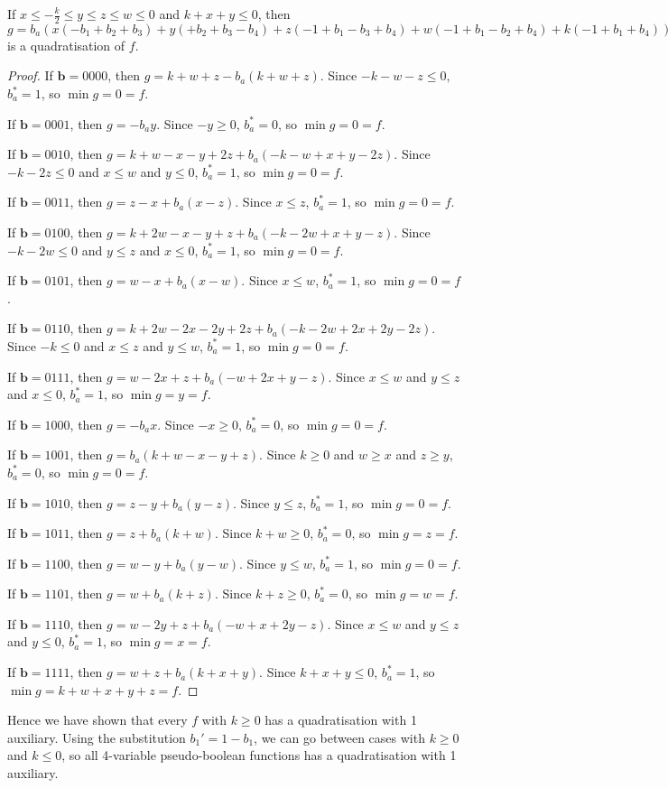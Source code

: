 \documentclass[11pt]{scrartcl}
\newcommand{\vc}[1]{\boldsymbol{#1}}
\begin{document}
\begin{lemma}
	\label{case2}
 If $x \le -\frac{k}{2} \le y \le z \le w \le 0$ and $k+x+y \le 0$, then $g = b_a(x(-b_1+b_2+b_3)+y(+b_2+b_3-b_4)+z(-1+b_1-b_3+b_4)+w(-1+b_1-b_2+b_4)+k(-1+b_1+b_4))+x(-b_2-b_3+b_1b_2+b_1b_3)+y(-b_2-b_3+b_2b_4+b_3b_4)+z(+1 -b_1+b_3-b_4+b_1b_4)+w(+1 -b_1+b_2-b_4+b_1b_4)+k(+1 -b_1-b_4+b_1b_4)$ is a quadratisation of $f$.
 \end{lemma}

\begin{proof}
If $\vc b = 0000$, then $g = k + w + z - b_a(k + w + z)$.
Since $-k - w - z \le 0$, $b_a^* = 1$, so $\min g = 0 = f$.

If $\vc b = 0001$, then $g = -b_ay$.
Since $-y \ge 0$, $b_a^* = 0 $, so $\min g = 0 = f$.

If $\vc b = 0010$, then $g = k + w - x - y + 2z + b_a(-k - w + x + y - 2z)$.
Since $-k - 2z \le 0$ and $x \le w$ and $ y \le 0$, $b_a^* = 1$, so $\min g = 0 = f$.

If $\vc b = 0011$, then $g = z - x + b_a(x - z)$.
Since $x \le z$, $b_a^* = 1$, so $\min g = 0 = f$.

If $\vc b = 0100$, then $g = k + 2w - x - y + z + b_a(-k - 2w + x + y - z)$.
Since $-k - 2w \le 0$ and $y \le z$ and $x \le 0$, $b_a^* = 1$, so $\min g = 0 = f$.

If $\vc b = 0101$, then $g = w - x + b_a(x - w)$.
Since $x \le w$, $b_a^* = 1$, so $\min g = 0 = f$.

If $\vc b = 0110$, then $g = k + 2w - 2x - 2y + 2z + b_a(-k -2w + 2x + 2y - 2z)$.
Since $-k \le 0$ and $x \le z$ and $y \le w$, $b_a^* = 1$, so $\min g = 0 = f$.

If $\vc b = 0111$, then $g = w - 2x + z + b_a(-w + 2x + y - z)$.
Since $x \le w$ and $y \le z$ and $x \le 0$, $b_a^* = 1$, so $\min g = y = f$.

If $\vc b = 1000$, then $g = -b_ax$.
Since $-x \ge 0$, $b_a^* = 0$, so $\min g = 0 = f$.

If $\vc b = 1001$, then $g = b_a(k + w - x - y + z)$.
Since $k \ge 0$ and $w \ge x $ and $z \ge y$, $b_a^* = 0$, so $\min g = 0 = f$.

If $\vc b = 1010$, then $g = z - y + b_a(y - z)$.
Since $y \le z$, $b_a^* = 1$, so $\min g = 0 = f$.

If $\vc b = 1011$, then $g = z + b_a(k + w)$.
Since $k + w \ge 0$, $b_a^* = 0$, so $\min g = z = f$.

If $\vc b = 1100$, then $g = w - y + b_a(y -w)$.
Since $y \le w$, $b_a^* = 1$, so $\min g = 0 = f$.

If $\vc b = 1101$, then $g = w + b_a(k + z)$.
Since $k+z \ge 0$, $b_a^* = 0 $, so $\min g = w = f$.

If $\vc b = 1110$, then $g = w - 2y + z + b_a(-w + x + 2y - z)$.
Since $x \le w$ and $ y \le z$ and $y \le 0$, $b_a^* = 1$, so $\min g = x =f $.

If $\vc b = 1111$, then $g = w + z + b_a(k + x + y)$.
Since $k+x + y \le 0$, $b_a^* = 1$, so $\min g = k + w + x + y + z = f$.
\end{proof}


Hence we have shown that every $f$ with $k\ge 0$ has a quadratisation with 1 auxiliary. Using the substitution $b_1'=1-b_1$,
we can go between cases with $k \ge 0$ and $k \le 0$, so all 4-variable pseudo-boolean functions has a quadratisation with 1 auxiliary.
\end{document}
